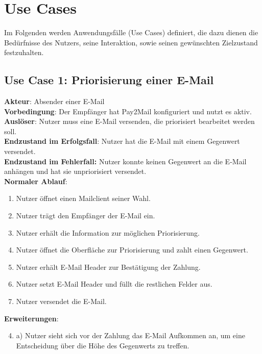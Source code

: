 
\section{Use Cases}
\label{Use_Cases}
Im Folgenden werden Anwendungsfälle (Use Cases) definiert, die dazu dienen die Bedürfnisse des Nutzers, seine Interaktion, sowie seinen gewünschten Zielzustand festzuhalten.

\subsection*{Use Case 1: Priorisierung einer E-Mail}
\textbf{Akteur}: Absender einer E-Mail \\
\textbf{Vorbedingung}: Der Empfänger hat Pay2Mail konfiguriert und nutzt es aktiv. \\
\textbf{Auslöser}: Nutzer muss eine E-Mail versenden, die priorisiert bearbeitet werden soll. \\
\textbf{Endzustand im Erfolgsfall}: Nutzer hat die E-Mail mit einem Gegenwert versendet. \\
\textbf{Endzustand im Fehlerfall:} Nutzer konnte keinen Gegenwert an die E-Mail anhängen und hat sie unpriorisiert versendet. \\

\noindent \textbf{Normaler Ablauf}:
\begin{enumerate}
    \item Nutzer öffnet einen Mailclient seiner Wahl.
    \item Nutzer trägt den Empfänger der E-Mail ein.
    \item Nutzer erhält die Information zur möglichen Priorisierung.
    \item Nutzer öffnet die Oberfläche zur Priorisierung und zahlt einen Gegenwert.
    \item Nutzer erhält E-Mail Header zur Bestätigung der Zahlung.
    \item Nutzer setzt E-Mail Header und füllt die restlichen Felder aus.
    \item Nutzer versendet die E-Mail.
\end{enumerate}

\noindent \textbf{Erweiterungen}:
\begin{enumerate}
\setcounter{enumi}{3}
    \item a) Nutzer sieht sich vor der Zahlung das E-Mail Aufkommen an, um eine Entscheidung über die Höhe des Gegenwerts zu treffen.
\end{enumerate}


